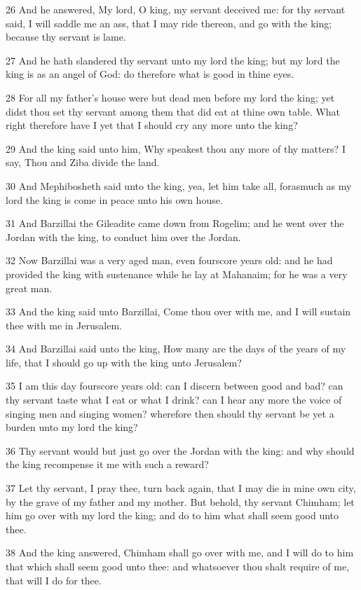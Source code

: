 \par 26 And he answered, My lord, O king, my servant deceived me: for thy servant said, I will saddle me an ass, that I may ride thereon, and go with the king; because thy servant is lame.
\par 27 And he hath slandered thy servant unto my lord the king; but my lord the king is as an angel of God: do therefore what is good in thine eyes.
\par 28 For all my father's house were but dead men before my lord the king; yet didst thou set thy servant among them that did eat at thine own table. What right therefore have I yet that I should cry any more unto the king?
\par 29 And the king said unto him, Why speakest thou any more of thy matters? I say, Thou and Ziba divide the land.
\par 30 And Mephibosheth said unto the king, yea, let him take all, forasmuch as my lord the king is come in peace unto his own house.
\par 31 And Barzillai the Gileadite came down from Rogelim; and he went over the Jordan with the king, to conduct him over the Jordan.
\par 32 Now Barzillai was a very aged man, even fourscore years old: and he had provided the king with sustenance while he lay at Mahanaim; for he was a very great man.
\par 33 And the king said unto Barzillai, Come thou over with me, and I will sustain thee with me in Jerusalem.
\par 34 And Barzillai said unto the king, How many are the days of the years of my life, that I should go up with the king unto Jerusalem?
\par 35 I am this day fourscore years old: can I discern between good and bad? can thy servant taste what I eat or what I drink? can I hear any more the voice of singing men and singing women? wherefore then should thy servant be yet a burden unto my lord the king?
\par 36 Thy servant would but just go over the Jordan with the king: and why should the king recompense it me with such a reward?
\par 37 Let thy servant, I pray thee, turn back again, that I may die in mine own city, by the grave of my father and my mother. But behold, thy servant Chimham; let him go over with my lord the king; and do to him what shall seem good unto thee.
\par 38 And the king answered, Chimham shall go over with me, and I will do to him that which shall seem good unto thee: and whatsoever thou shalt require of me, that will I do for thee.
